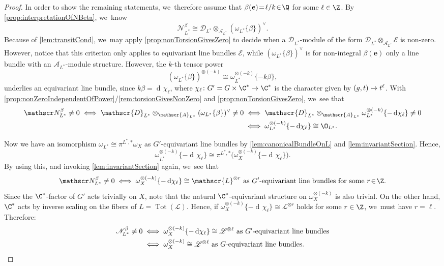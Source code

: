 \documentclass[JEP,XML,SOM,Unicode,published]{cedram}
\newcommand\mto{\mathchoice{\longmapsto}{\mapsto}{\mapsto}{\mapsto}}
\newcommand{\bme}{{\boldsymbol{e}}}
\newcommand{\cA}{\mathscr{A}}
\newcommand{\Ell}{\mathscr{L}}
\DeclareMathOperator{\differential}{d\!}
\DeclareMathOperator{\Tot}{Tot}
\begin{document}
\begin{proof}
In order to show the remaining statements, we~therefore assume that \hbox{$\beta(\bme) \!=\! \ell/k \!\in\! \Q$} for some $\ell\in\Z$. By \cref{prop:interpretationOfNBeta}, we~know
\[
\mathscr{N}_{L^*}^{\beta} \cong \mathscr{D}_{L^*} \otimes_{\cA_{L^*}} (\omega_{L^*}\{\beta\})^\vee.
\]
Because of \cref{lem:transitCond}, we~may apply \cref{prop:nonTorsionGivesZero} to decide when a $\mathscr D_{L^*}$\nobreakdash-mod\-ule of the form ${\mathscr D_{L^*} \otimes_{\cA_{L^*}} \mathscr E}$ is non-zero. However, notice that this criterion only applies to equivariant line bundles $\mathscr E$, while $(\omega_{L^*}\{\beta\})^\vee$ is for non-integral $\beta(\bme)$ only a line bundle with an $\cA_{L^*}$\nobreakdash-mod\-ule structure. However, the $k$-th tensor power
\[
(\omega_{L^*}\{\beta\})^{\otimes (-k)} \cong \omega_{L^*}^{\otimes (-k)}\{-k\beta\},
\]
underlies an equivariant line bundle, since $k\beta =\differential\chi_{\ell}$, where \hbox{$\chi_{\ell} \colon G'=G \times \C^* \to \C^*$} is the character given by $(g,t) \mto t^{\ell}$. With \cref{prop:nonZeroIndependentOfPower}/\cref{rem:torsionGivesNonZero} and \cref{prop:nonTorsionGivesZero}, we~see that
\begin{align*}
\mathscr N_{L^*}^\beta \neq 0 \iff\mathscr{D}_{L^*} \otimes_{\cA_{L^*}} (\omega_{L^*}\{\beta\})^\vee \neq 0
&\iff \mathscr{D}_{L^*} \otimes_{\cA_{L^*}} \omega_{L^*}^{\otimes (-k)}\{-\differential\chi_\ell\} \neq 0 \\
&\iff\omega_{L^*}^{\otimes (-k)}\{-\differential\chi_\ell\} \cong \O_{L^*}.
\end{align*}

Now we have an isomorphism $\omega_{L^*} \cong \pi^{L^*,*} \omega_X$ as $G'$-equivariant line bundles by \cref{lem:canonicalBundleOnL} and \cref{lem:invariantSection}. Hence,
\[
\omega_{L^*}^{\otimes (-k)}\{-\differential\chi_\ell\} \cong \pi^{L^*,*} \big(\omega_X^{\otimes (-k)}\{-\differential\chi_\ell\}\big).
\]
By using this, and invoking \cref{lem:invariantSection} again, we~see that
\[
\mathscr N_{L^*}^\beta \neq 0 \iff \omega_X^{\otimes (-k)}\{-\differential\chi_\ell\} \cong \Ell^{\otimes r} \text{ as $G'$-equivariant line bundles for some $r\!\in\! \Z$}.
\]
Since the $\C^*$-factor of $G'$ acts trivially on $X$, note that the natural $\C^*$-equivariant structure on $\omega_X^{\otimes (-k)}$ is also trivial. On the other hand, $\C^*$ acts by inverse scaling on the fibers of $L = \Tot(\Ell)$. Hence, if $\omega_X^{\otimes (-k)}\{-\differential\chi_\ell\} \cong \Ell^{\otimes r}$ holds for some $r \in \Z$, we~must have $r = \ell$. Therefore:
\begin{align*}
\mathscr N_{L^*}^\beta \neq 0 &\iff\omega_X^{\otimes (-k)}\{-\differential\chi_\ell\} \cong \Ell^{\otimes \ell} \text{ as $G'$-equivariant line bundles} \\
&\iff \omega_X^{\otimes (-k)} \cong \Ell^{\otimes \ell} \text{ as $G$-equivariant line bundles}. \qedhere
\end{align*}
\end{proof}
\end{document}
